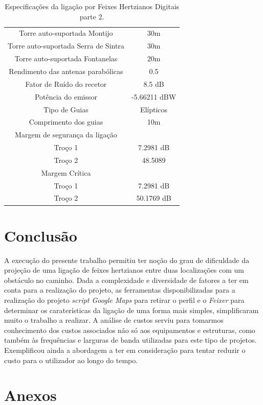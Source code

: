 \begin{table}[H]
\centering
\begin{tabular}{|c|c|}
\hline
Torre auto-suportada Montijo & 30m\\
Torre auto-suportada Serra de Sintra & 30m\\
Torre auto-suportada Fontanelas & 20m\\
Rendimento das antenas parabólicas & 0.5\\
Fator de Ruído do recetor & 8.5 dB\\
Potência do emissor & -5.66211 dBW\\
Tipo de Guias & Elípticos\\
Comprimento dos guias & 10m\\
Margem de segurança da ligação & \\
 Troço 1 & 7.2981 dB\\
 Troço 2 & 48.5089\\
Margem Crítica & \\
Troço 1 & 7.2981 dB\\
Troço 2 & 50.1769 dB\\
\hline
\end{tabular}
\caption{Especificações da ligação por Feixes Hertzianos Digitais parte 2.}
\end{table}


 
\section{Conclusão}
A execução do presente trabalho permitiu ter noção do grau de dificuldade da projeção de uma ligação de feixes hertzianos entre duas localizações com um obstáculo no caminho. Dada a complexidade e diversidade de fatores a ter em conta para a realização do projeto, as ferramentas disponibilizadas para a realização do projeto \textit{script Google Maps} para retirar o perfil e o \textit{Feixer} para determinar os caraterísticas da ligação de uma forma mais simples, simplificaram muito o trabalho a realizar. A análise de custos serviu para tomarmos conhecimento dos custos associados não só aos equipamentos e estruturas, como também às frequências e larguras de banda utilizadas para este tipo de projetos. Exemplificou ainda a abordagem a ter em consideração para tentar reduzir o custo para o utilizador ao longo do tempo.  
\pagebreak
\section{Anexos}


